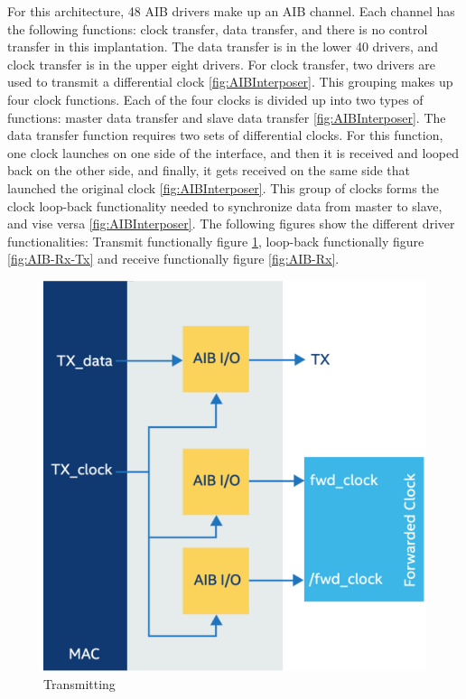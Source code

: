 \documentclass[../main.tex]{subfiles}
\begin{document}
 For this architecture, 48 AIB drivers make up an AIB channel. Each channel has the following functions: clock transfer, data transfer, and there is no control transfer in this implantation. The data transfer is in the lower 40 drivers, and clock transfer is in the upper eight drivers. For clock transfer, two drivers are used to transmit a differential clock \ref{fig:AIBInterposer}. This grouping makes up four clock functions. Each of the four clocks is divided up into two types of functions: master data transfer and slave data transfer \ref{fig:AIBInterposer}. The data transfer function requires two sets of differential clocks. For this function, one clock launches on one side of the interface, and then it is received and looped back on the other side, and finally, it gets received on the same side that launched the original clock \ref{fig:AIBInterposer}. This group of clocks forms the clock loop-back functionality needed to synchronize data from master to slave, and vise versa \ref{fig:AIBInterposer}. The following figures show the different driver functionalities: Transmit functionally figure \ref{fig:AIB-Tx}, loop-back functionally figure \ref{fig:AIB-Rx-Tx} and receive functionally figure \ref{fig:AIB-Rx}. 

\begin{figure}
    \centering
    \includegraphics[scale=.16]{pngs/AIB-Tx.png}
    \caption{Transmitting\cite{AIBWhitePaper}}
    \label{fig:AIB-Tx}
\end{figure}
\end{document}
